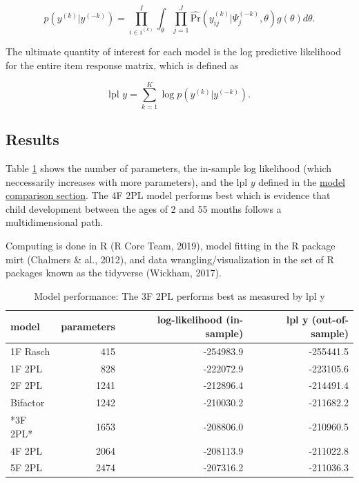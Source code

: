 \documentclass[10pt, letterpaper]{article}
\newenvironment{CodeChunk}{}{}
\begin{document}
\[
p(y^{(k)} | y^{(-k)}) = \prod_{i \in i^{(k)}}^{I} \int_\theta \prod_{j=1}^{J} \hat{\text{Pr}}(y_{ij}^{(k)} | \Psi_j^{(-k)}, \theta) g(\theta)d\theta.
\]

The ultimate quantity of interest for each model is the log predictive
likelihood for the entire item response matrix, which is defined as

\[
\text{lpl } y = \sum_{k = 1}^{K} \log p(y^{(k)} | y^{(-k)}).
\]

\hypertarget{results}{%
\subsection{Results}\label{results}}

Table \ref{tab:results} shows the number of parameters, the in-sample
log likelihood (which neccessarily increases with more parameters), and
the \(\text{lpl } y\) defined in the
\protect\hyperlink{modelcompare}{model comparison section}. The 4F 2PL
model performs best which is evidence that child development between the
ages of 2 and 55 months follows a multidimensional path.

Computing is done in R (R Core Team, 2019), model fitting in the R
package mirt (Chalmers \& al., 2012), and data wrangling/visualization
in the set of R packages known as the tidyverse (Wickham, 2017).

\begin{CodeChunk}
\begin{table}[!h]

\caption{\label{tab:results}Model performance: The 3F 2PL performs best as measured by lpl y}
\centering
\fontsize{8}{10}\selectfont
\begin{tabular}[t]{l|r|r|r}
\hline
model & parameters & log-likelihood (in-sample) & lpl y (out-of-sample)\\
\hline
1F Rasch & 415 & -254983.9 & -255441.5\\
\hline
1F 2PL & 828 & -222072.9 & -223105.6\\
\hline
2F 2PL & 1241 & -212896.4 & -214491.4\\
\hline
Bifactor & 1242 & -210030.2 & -211682.2\\
\hline
*3F 2PL* & 1653 & -208806.0 & -210960.5\\
\hline
4F 2PL & 2064 & -208113.9 & -211022.8\\
\hline
5F 2PL & 2474 & -207316.2 & -211036.3\\
\hline
\end{tabular}
\end{table}

\end{CodeChunk}
\end{document}
